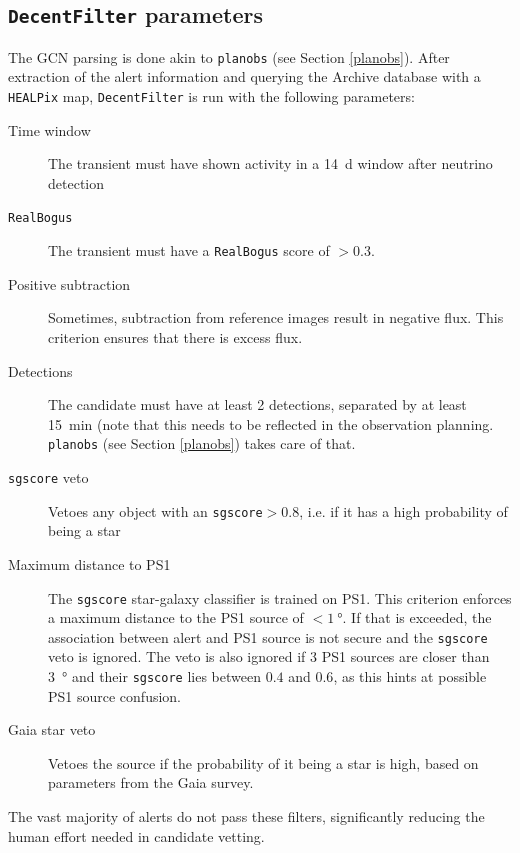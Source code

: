 \documentclass[
    a4paper, %
    fontsize=10pt, %
    twoside=true, %
    numbers=noenddot, %
    fontmethod=tex,
]{kaobook}
\begin{document}
\subsection{\texttt{DecentFilter} parameters}
The GCN parsing is done akin to \texttt{planobs} (see Section \ref{planobs}). After extraction of the alert information and querying the Archive database with a \texttt{HEALPix} map, \texttt{DecentFilter} is run with the following parameters:
\begin{description}
    \item[Time window] The transient must have shown activity in a \SI{14}{\day} window after neutrino detection
    \item[\texttt{RealBogus}] The transient must have a \texttt{RealBogus} score of $>0.3$.
    \item[Positive subtraction] Sometimes, subtraction from reference images result in negative flux. This criterion ensures that there is excess flux.
    \item[Detections] The candidate must have at least 2 detections, separated by at least \SI{15}{\minute} (note that this needs to be reflected in the observation planning. \texttt{planobs} (see Section \ref{planobs}) takes care of that.
    \item[\texttt{sgscore} veto] Vetoes any object with an \texttt{sgscore}$>0.8$, i.e. if it has a high probability of being a star
    \item[Maximum distance to PS1] The \texttt{sgscore} star-galaxy classifier is trained on PS1. This criterion enforces a maximum distance to the PS1 source of $<\SI{1}{\degree}$. If that is exceeded, the association between alert and PS1 source is not secure and the \texttt{sgscore} veto is ignored. The veto is also ignored if 3 PS1 sources are closer than \SI{3}{\degree} and their \texttt{sgscore} lies between $0.4$ and $0.6$, as this hints at possible PS1 source confusion.
    \item[Gaia star veto] Vetoes the source if the probability of it being a star is high, based on parameters from the Gaia survey.
\end{description}
The vast majority of alerts do not pass these filters, significantly reducing the human effort needed in candidate vetting. 
\end{document}
